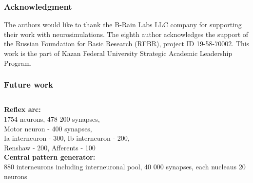 \documentclass[12pt, aspectratio=169]{beamer}
\begin{document}
\begin{frame}
  \frametitle{Acknowledgment}
The authors would like to thank the B-Rain Labs LLC company for supporting their work with neurosimulations. The eighth author acknowledges the support of the Russian Foundation for Basic Research (RFBR), project ID 19-58-70002. 
This work is the part of Kazan Federal University Strategic Academic Leadership Program. 

\end{frame}

\begin{frame}
  \frametitle{Future work}
\begin{columns}[c]

\textbf{Reflex arc:}\\
1754 neurons, 478 200 synapses,\\
Motor neuron - 400 synapses,\\
Ia interneuron - 300,
Ib interneuron - 200,\\
Renshaw - 200,
Afferents - 100\\

\textbf{Central pattern generator:}\\
880 interneurons including interneuronal pool,
40 000 synapses,
each nucleaus 20 neurons


\end{columns}
\end{frame}
\end{document}
